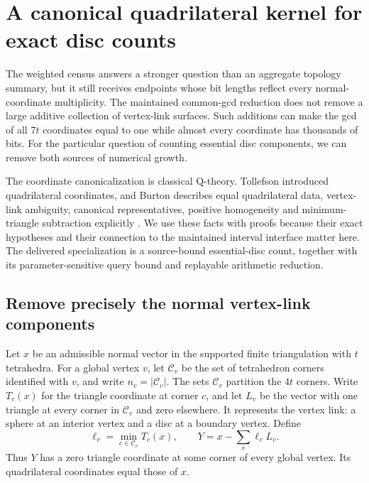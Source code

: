 \section{A canonical quadrilateral kernel for exact disc counts}
\label{sec:quadrilateral-core}

The weighted census answers a stronger question than an aggregate topology
summary, but it still receives endpoints whose bit lengths reflect every
normal-coordinate multiplicity. The maintained common-gcd reduction does not
remove a large additive collection of vertex-link surfaces. Such additions
can make the gcd of all $7t$ coordinates equal to one while almost every
coordinate has thousands of bits. For the particular question of counting
essential disc components, we can remove both sources of numerical growth.

The coordinate canonicalization is classical Q-theory. Tollefson introduced
quadrilateral coordinates, and Burton describes equal quadrilateral data,
vertex-link ambiguity, canonical representatives, positive homogeneity and
minimum-triangle subtraction explicitly
\cite{Tollefson1998,Burton2009}. We use these facts with proofs because their
exact hypotheses and their connection to the maintained interval interface
matter here. The delivered specialization is a source-bound essential-disc
count, together with its parameter-sensitive query bound and replayable
arithmetic reduction.

\subsection{Remove precisely the normal vertex-link components}

Let $x$ be an admissible normal vector in the supported finite triangulation
with $t$ tetrahedra. For a global vertex $v$, let $\mathcal C_v$ be the set of
tetrahedron corners identified with $v$, and write $n_v=|\mathcal C_v|$.
The sets $\mathcal C_v$ partition the $4t$ corners. Write $T_c(x)$ for the
triangle coordinate at corner $c$, and let $L_v$ be the vector with one
triangle at every corner in $\mathcal C_v$ and zero elsewhere. It represents
the vertex link: a sphere at an interior vertex and a disc at a boundary
vertex. Define
\[
 \ell_v=\min_{c\in\mathcal C_v}T_c(x),
 \qquad Y=x-\sum_v\ell_vL_v.
\]
Thus $Y$ has a zero triangle coordinate at some corner of every global
vertex. Its quadrilateral coordinates equal those of $x$.


